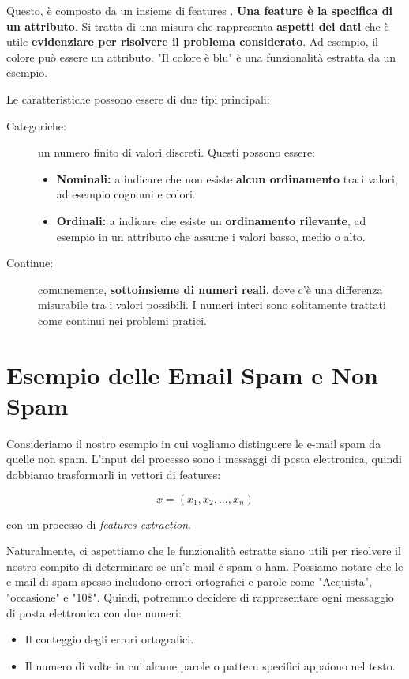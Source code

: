 \noindent
Questo, è composto da un insieme di features . \textbf{Una feature è la specifica di un attributo}.
Si tratta di una misura che rappresenta \textbf{aspetti dei dati }che è utile \textbf{evidenziare per risolvere il problema considerato}. Ad esempio, il colore può essere un attributo. "Il colore è blu" è una funzionalità estratta da un esempio.

\noindent
Le caratteristiche possono essere di due tipi principali:

\begin{description}
    \item[Categoriche:] un numero finito di valori discreti. Questi possono essere:
    \begin{itemize}
        \item \textbf{Nominali:} a indicare che non esiste \textbf{alcun ordinamento} tra i valori, ad esempio cognomi e colori.
        \item \textbf{Ordinali:} a indicare che esiste un \textbf{ordinamento rilevante}, ad esempio in un attributo che assume i valori basso, medio o alto.
    \end{itemize}
    \item[Continue:] comunemente, \textbf{sottoinsieme di numeri reali}, dove c'è una differenza misurabile tra i valori possibili. I numeri interi sono solitamente trattati come continui nei problemi pratici.
\end{description}

\section{Esempio delle Email Spam e Non Spam}

Consideriamo il nostro esempio in cui vogliamo distinguere le e-mail spam da quelle non spam.
L'input del processo sono i messaggi di posta elettronica, quindi dobbiamo trasformarli in vettori di features:

$$ x = (x_1, x_2, ..., x_n)$$

\noindent
con un processo di \emph{features extraction}.

Naturalmente, ci aspettiamo che le funzionalità estratte siano utili per risolvere il nostro compito di determinare se un'e-mail è spam o ham. Possiamo notare che le e-mail di spam spesso includono errori ortografici e parole come "Acquista", "occasione" e "10\$". Quindi, potremmo decidere di rappresentare ogni messaggio di posta elettronica con due numeri:

\begin{itemize}
    \item Il conteggio degli errori ortografici.
    \item Il numero di volte in cui alcune parole o pattern specifici appaiono nel testo.
\end{itemize}


